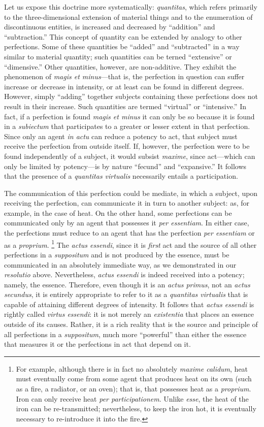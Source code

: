 Let us expose this doctrine more systematically: \emph{quantitas}, which refers primarily to the three-dimensional extension of material things and to the enumeration of discontinuous entities, is increased and decreased by “addition” and “subtraction.” This concept of quantity can be extended by analogy to other perfections. Some of these quantities be “added” and “subtracted” in a way similar to material quantity; such quantities can be terned “extensive” or “dimensive.” Other quantities, however, are non-additive. They exhibit the phenomenon of \emph{magis et minus}—that is, the perfection in question can suffer increase or decrease in intensity, or at least can be found in different degrees. However, simply “adding” together subjects containing these perfections does not result in their increase. Such quantities are termed “virtual” or “intensive.” In fact, if a perfection is found \emph{magis et minus} it can only be so because it is found in a \emph{subiectum} that participates to a greater or lesser extent in that perfection. Since only an agent \emph{in actu} can reduce a potency to act, that subject must receive the perfection from outside itself. If, however, the perfection were to be found independently of a subject, it would subsist \emph{maxime}, since act—which can only be limited by potency—is by nature “fecund” and “expansive.”  It follows that the presence of a \emph{quantitas virtualis} necessarily entails a participation.

The communication of this perfection could be mediate, in which a subject, upon receiving the perfection, can communicate it in turn to another subject: as, for example, in the case of heat. On the other hand, some perfections can be communicated only by an agent that possesses it \emph{per essentiam}. In either case, the perfections must reduce to an agent that has the perfection \emph{per essentiam} or as a \emph{proprium}.%
%
\footnote{For example, although there is in fact no absolutely \emph{maxime calidum}, heat must eventually come from some agent that produces heat on its own (such as a fire, a radiator, or an oven); that is, that possesses heat as a \emph{proprium}. Iron can only receive heat \emph{per participationem}. Unlike \emph{esse}, the heat of the iron can be re-transmitted; nevertheless, to keep the iron hot, it is eventually necessary to re-introduce it into the fire.}
%
The \emph{actus essendi}, since it is \emph{first} act and the source of all other perfections in a \emph{suppositum} and is not produced by the essence, must be communicated in an absolutely immediate way, as we demonstrated in our \emph{resolutio} above. Nevertheless, \emph{actus essendi} is indeed received into a potency; namely, the essence. Therefore, even though it is an \emph{actus primus}, not an \emph{actus secundus}, it is entirely appropriate to refer to it as a \emph{quantitas virtualis} that is capable of attaining different degrees of intensity. It follows that \emph{actus essendi} is rightly called \emph{virtus essendi}: it is not merely an \emph{existentia} that places an essence outside of its causes. Rather, it is a rich reality that is the source and principle of all perfections in a \emph{suppositum}, much more “powerful” than either the essence that measures it or the perfections in act that depend on it.

